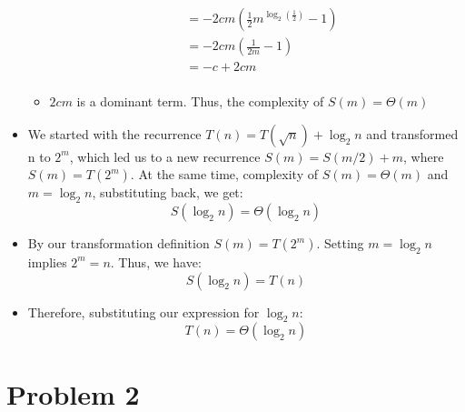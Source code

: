\documentclass{article}
\begin{document}
\begin{itemize}
\begin{itemize}
\begin{align}
					 &= -2cm\left(\frac{1}{2}m^{\log_2(\frac{1}{2})} - 1\right) \\
					 &= -2cm\left(\frac{1}{2m} - 1\right) \\
					 &= -c + 2cm \\
			\end{align}
			\item \(2cm\) is a dominant term. Thus, the complexity of \(S(m) = \Theta(m)\)
		\end{itemize}
		\item We started with the recurrence \(T(n) = T(\sqrt{n}) + \log_2n\) and transformed n to \(2^m\), which led us to a new recurrence \(S(m) = S(m/2) + m\), where \(S(m) = T(2^m)\). At the same time, complexity of \(S(m) = \Theta(m)\) and \(m = \log_2n\), substituting back, we get:
		\[S(\log_2n) = \Theta(\log_2n)\]
		\item By our transformation definition \(S(m) = T(2^m)\). Setting \(m = \log_2n\) implies \(2^m = n\). Thus, we have:
		\[S(\log_2n) = T(n)\]
		\item Therefore, substituting our expression for \(\log_2n\):
		\[T(n) = \Theta(\log_2n)\]
	\end{itemize}

	\newpage \section*{Problem 2}
\end{document}
